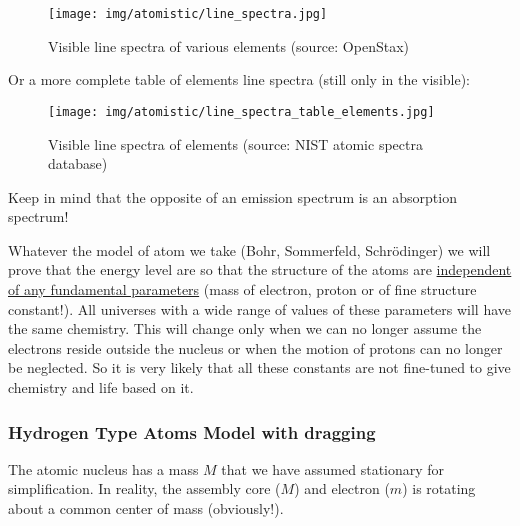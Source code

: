 	\begin{figure}[H]
		\centering
		\texttt{[image: img/atomistic/line\_spectra.jpg]}
		\caption[Visible line spectra of various elements]{Visible line spectra of various elements (source: OpenStax)}
	\end{figure}
	Or a more complete table of elements line spectra (still only in the visible):
	\begin{figure}[H]
		\centering
		\texttt{[image: img/atomistic/line\_spectra\_table\_elements.jpg]}
		\caption[Visible line spectra of elements]{Visible line spectra of elements (source: NIST atomic spectra database)}
	\end{figure}
	Keep in mind that the opposite of an emission spectrum is an absorption spectrum!
	
	\begin{tcolorbox}[colback=red!5,borderline={1mm}{2mm}{red!5},arc=0mm,boxrule=0pt]
	\bcbombe Whatever the model of atom we take (Bohr, Sommerfeld, Schrödinger) we will prove that the energy level are so that the structure of the atoms are \underline{independent of any fundamental parameters} (mass of electron, proton or of fine structure constant!). All universes with a wide range of values of these parameters will have the same chemistry. This will change only when we can no longer assume the electrons reside outside the nucleus or when the motion of protons can no longer be neglected. So it is very likely that all these constants are not fine-tuned to give chemistry and life based on it.
	\end{tcolorbox}
	

	\subsubsection{Hydrogen Type Atoms Model with dragging}
	
	The atomic nucleus has a mass $M$ that we have assumed stationary for simplification. In reality, the assembly core ($M$) and electron ($m$) is rotating about a common center of mass (obviously!).
	

